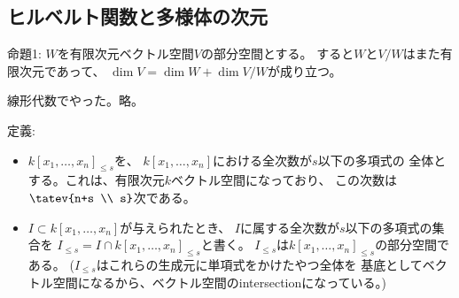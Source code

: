 
\subsection{ヒルベルト関数と多様体の次元}
\label{sub:ヒルベルト関数と多様体の次元}

\begin{framed}
  命題1:
  $W$を有限次元ベクトル空間$V$の部分空間とする。
  すると$W$と$V/W$はまた有限次元であって、
  $\dim V = \dim W + \dim V/W$が成り立つ。
\end{framed}
\begin{myproof}
  線形代数でやった。略。
\end{myproof}

\begin{framed}
  定義:
  \begin{itemize}
    \item   $k[x_1,\dots,x_n]_{\le s}$を、
      $k[x_1,\dots,x_n]$における全次数が$s$以下の多項式の
      全体とする。これは、有限次元$k$ベクトル空間になっており、
      この次数は$\tatev{n+s \\ s}$次である。
    \item
    $I\subset k[x_1,\dots,x_n]$が与えられたとき、
    $I$に属する全次数が$s$以下の多項式の集合を
    $I_{\le s} = I\cap k[x_1,\dots,x_n]_{\le s}$と書く。
    $I_{\le s}$は$k[x_1,\dots, x_n]_{\le s}$の部分空間である。
    (\pf $I_{\le s}$はこれらの生成元に単項式をかけたやつ全体を
    基底としてベクトル空間になるから、ベクトル空間のintersectionになっている。)
  \end{itemize}


\end{framed}

